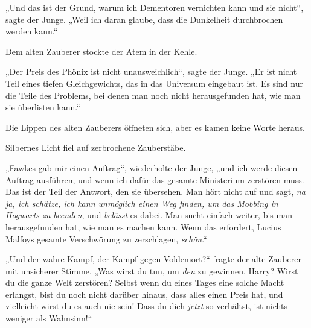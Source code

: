 „Und das ist der Grund, warum ich Dementoren vernichten kann und sie nicht“, sagte der Junge.
„Weil ich daran glaube, dass die Dunkelheit durchbrochen werden kann.“

Dem alten Zauberer stockte der Atem in der Kehle.

„Der Preis des Phönix ist nicht unausweichlich“, sagte der Junge.
„Er ist nicht Teil eines tiefen Gleichgewichts, das in das Universum eingebaut ist. Es sind nur die Teile des Problems, bei denen man noch nicht herausgefunden hat, wie man sie überlisten kann.“

Die Lippen des alten Zauberers öffneten sich, aber es kamen keine Worte heraus.

Silbernes Licht fiel auf zerbrochene Zauberstäbe.

„Fawkes gab mir einen Auftrag“, wiederholte der Junge, „und ich werde diesen Auftrag ausführen, und wenn ich dafür das gesamte Ministerium zerstören muss. Das ist der Teil der Antwort, den sie übersehen. Man hört nicht auf und sagt, \emph{na ja, ich schätze, ich kann unmöglich einen Weg finden, um das Mobbing in Hogwarts zu beenden}, und \emph{belässt} es dabei. Man sucht einfach weiter, bis man herausgefunden hat, wie man es machen kann. Wenn das erfordert, Lucius Malfoys gesamte Verschwörung zu zerschlagen, \emph{schön}.“

„Und der wahre Kampf, der Kampf gegen Voldemort?“ fragte der alte Zauberer mit unsicherer Stimme.
„Was wirst du tun, um \emph{den} zu gewinnen, Harry? Wirst du die ganze Welt zerstören? Selbst wenn du eines Tages eine solche Macht erlangst, bist du noch nicht darüber hinaus, dass alles einen Preis hat, und vielleicht wirst du es auch nie sein! Dass du dich \emph{jetzt} so verhältst, ist nichts weniger als Wahnsinn!“

